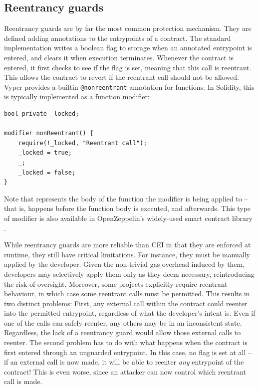 \subsection{Reentrancy guards}
Reentrancy guards are by far the most common protection mechanism. They are defined adding annotations to the entrypoints of a contract. The standard implementation writes a boolean flag to storage when an annotated entrypoint is entered, and clears it when execution terminates. Whenever the contract is entered, it first checks to see if the flag is set, meaning that this call is reentrant. This allows the contract to revert if the reentrant call should not be allowed. Vyper provides a builtin \lstinline{@nonreentrant} annotation for functions. In Solidity, this is typically implemented as a function modifier:
\begin{lstlisting}[language=Solidity, style=boxedSol]
bool private _locked;

modifier nonReentrant() {
    require(!_locked, "Reentrant call");
    _locked = true;
    _;
    _locked = false;
}
\end{lstlisting}
Note that \solinline{_;} represents the body of the function the modifier is being applied to -- that is,  happens before the function body is executed, and  afterwards. This type of modifier is also available in OpenZeppelin's widely-used smart contract library \cite{openzeppelin}.
\par
While reentrancy guards are more reliable than CEI in that they are enforced at runtime, they still have critical limitations. For instance, they must be manually applied by the developer. Given the non-trivial gas overhead induced by them, developers may selectively apply them only as they deem necessary, reintroducing the risk of oversight. Moreover, some projects explicitly require reentrant behaviour, in which case some reentrant calls must be permitted. This results in two distinct problems: First, any external call within the contract could reenter into the permitted entrypoint, regardless of what the developer's intent is. Even if one of the calls can safely reenter, any others may be in an inconsistent state. Regardless, the lack of a reentrancy guard would allow those external calls to reenter. The second problem has to do with what happens when the contract is first entered through an unguarded entrypoint. In this case, no flag is set at all -- if an external call is now made, it will be able to reenter \textit{any} entrypoint of the contract! This is even worse, since an attacker can now control which reentrant call is made.

